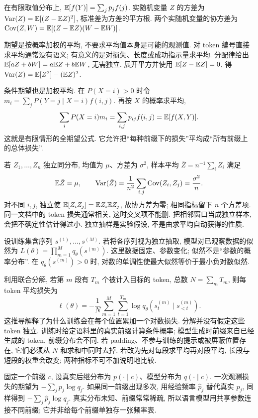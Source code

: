 \begin{definition}
在有限取值分布上, $\mathbb E[f(Y)]=\sum_jp_jf(j)$. 实随机变量 $Z$ 的方差为 $\operatorname{Var}(Z)=\mathbb E[(Z-\mathbb E Z)^2]$, 标准差为方差的平方根. 两个实随机变量的协方差为 $\operatorname{Cov}(Z,W)=\mathbb E[(Z-\mathbb E Z)(W-\mathbb E W)]$.
\end{definition}
期望是按概率加权的平均, 不要求平均值本身是可能的观测值. 对 token 编号直接求平均通常没有语义; 有意义的是对损失、长度或成功指示量求平均. 分配律给出 $\mathbb E[aZ+bW]=a\mathbb E Z+b\mathbb E W$, 无需独立. 展开平方并使用 $\mathbb E[Z-\mathbb E Z]=0$, 得 $\operatorname{Var}(Z)=\mathbb E[Z^2]-(\mathbb E Z)^2$.

条件期望也是加权平均. 在 $P(X=i)>0$ 时令 $m_i=\sum_jP(Y=j\mid X=i)f(i,j)$. 再按 $X$ 的概率求平均,
\[
\sum_iP(X=i)m_i=\sum_{i,j}p_{ij}f(i,j)=\mathbb E[f(X,Y)].
\]
这就是有限情形的全期望公式. 它允许把“每种前缀下的损失”平均成“所有前缀上的总体损失”.

若 $Z_1,\ldots,Z_n$ 独立同分布, 均值为 $\mu$、方差为 $\sigma^2$, 样本平均 $\bar Z=n^{-1}\sum_iZ_i$ 满足
\[
\mathbb E\bar Z=\mu,\qquad
\operatorname{Var}(\bar Z)=\frac1{n^2}\sum_{i,j}\operatorname{Cov}(Z_i,Z_j)=\frac{\sigma^2}{n}.
\]
对不同 $i,j$, 独立使 $\mathbb E[Z_iZ_j]=\mathbb E Z_i\mathbb E Z_j$, 故协方差为零; 相同指标留下 $n$ 个方差项. 同一文档中的 token 损失通常相关, 这时交叉项不能删. 把相邻窗口当成独立样本, 会把不确定性估计得过小. 独立抽样是实验假设, 不是由求平均自动获得的性质.

设训练集含序列 $s^{(1)},\ldots,s^{(M)}$. 若将各序列视为独立抽取, 模型对已观察数据的似然为 $L(\theta)=\prod_{m=1}^Mq_\theta(s^{(m)})$. 这里数据固定、参数变化; 似然不是“参数的概率分布”. 在 $q_\theta(s^{(m)})>0$ 时, 对数的单调性使最大似然等价于最小负对数似然.

利用联合分解, 若第 $m$ 段有 $T_m$ 个被计入目标的 token, 总数 $N=\sum_mT_m$, 则每 token 平均损失为
\[
\ell(\theta)=-\frac1N\sum_{m=1}^M\sum_{t=1}^{T_m}
\log q_\theta(s_t^{(m)}\mid s_{<t}^{(m)}).
\]
这推导解释了为什么训练会在每个位置累加一个对数损失. 分解并没有假定这些 token 独立. 训练时给定语料里的真实前缀计算条件概率; 模型生成时前缀来自已经生成的 token, 前缀分布会不同. 若 padding、不参与训练的提示或被屏蔽位置存在, 它们必须从 $N$ 和求和中同时去掉. 若改为先对每段求平均再对段平均, 长段与短段的权重会改变; 两种指标不可不加说明地比较.

固定一个前缀 $c$, 设真实后继分布为 $p(\cdot\mid c)$、模型分布为 $q(\cdot\mid c)$. 一次观测损失的期望为 $-\sum_jp_j\log q_j$. 如果同一前缀出现多次, 用经验频率 $\hat p_j$ 替代真实 $p_j$, 同样得到 $-\sum_j\hat p_j\log q_j$. 真实分布未知、前缀常常稀疏, 所以语言模型用共享参数连接不同前缀; 它并非给每个前缀单独存一张频率表.

